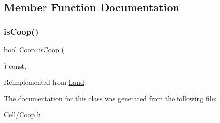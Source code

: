 \subsection{Member Function Documentation}
\mbox{\label{classCoop_af611b31347d3a8cf2304af22ecbfc450}} 
\subsubsection{\texorpdfstring{isCoop()}{isCoop()}}
{\footnotesize\ttfamily bool Coop\+::is\+Coop (\begin{DoxyParamCaption}{ }\end{DoxyParamCaption}) const\hspace{0.3cm}{\ttfamily [inline]}, {\ttfamily [virtual]}}



Reimplemented from \mbox{\hyperlink{classLand_a685f9ec0e771dbf0fe348dd13d467c4e}{Land}}.



The documentation for this class was generated from the following file\+:\begin{DoxyCompactItemize}
\item 
Cell/\mbox{\hyperlink{Coop_8h}{Coop.\+h}}\end{DoxyCompactItemize}
